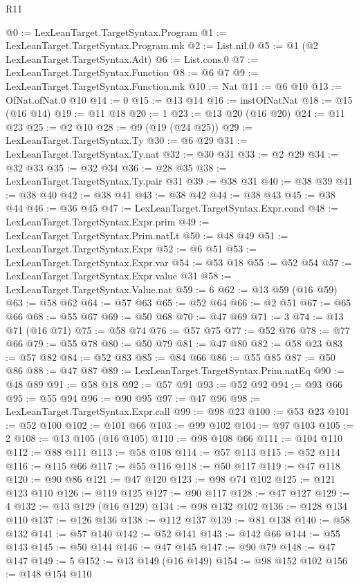 \begin{lexlean}{R11}
\begin{coremodule}
@0 := LexLeanTarget.TargetSyntax.Program
@1 := LexLeanTarget.TargetSyntax.Program.mk
@2 := List.nil.{0}
@5 := @1 (@2 LexLeanTarget.TargetSyntax.Adt)
@6 := List.cons.{0}
@7 := LexLeanTarget.TargetSyntax.Function
@8 := @6 @7
@9 := LexLeanTarget.TargetSyntax.Function.mk
@10 := Nat
@11 := @6 @10
@13 := OfNat.ofNat.{0} @10
@14 := 0
@15 := @13 @14
@16 := instOfNatNat
@18 := @15 (@16 @14)
@19 := @11 @18
@20 := 1
@23 := @13 @20 (@16 @20)
@24 := @11 @23
@25 := @2 @10
@28 := @9 (@19 (@24 @25))
@29 := LexLeanTarget.TargetSyntax.Ty
@30 := @6 @29
@31 := LexLeanTarget.TargetSyntax.Ty.nat
@32 := @30 @31
@33 := @2 @29
@34 := @32 @33
@35 := @32 @34
@36 := @28 @35
@38 := LexLeanTarget.TargetSyntax.Ty.pair @31
@39 := @38 @31
@40 := @38 @39
@41 := @38 @40
@42 := @38 @41
@43 := @38 @42
@44 := @38 @43
@45 := @38 @44
@46 := @36 @45
@47 := LexLeanTarget.TargetSyntax.Expr.cond
@48 := LexLeanTarget.TargetSyntax.Expr.prim
@49 := LexLeanTarget.TargetSyntax.Prim.natLt
@50 := @48 @49
@51 := LexLeanTarget.TargetSyntax.Expr
@52 := @6 @51
@53 := LexLeanTarget.TargetSyntax.Expr.var
@54 := @53 @18
@55 := @52 @54
@57 := LexLeanTarget.TargetSyntax.Expr.value @31
@58 := LexLeanTarget.TargetSyntax.Value.nat
@59 := 6
@62 := @13 @59 (@16 @59)
@63 := @58 @62
@64 := @57 @63
@65 := @52 @64
@66 := @2 @51
@67 := @65 @66
@68 := @55 @67
@69 := @50 @68
@70 := @47 @69
@71 := 3
@74 := @13 @71 (@16 @71)
@75 := @58 @74
@76 := @57 @75
@77 := @52 @76
@78 := @77 @66
@79 := @55 @78
@80 := @50 @79
@81 := @47 @80
@82 := @58 @23
@83 := @57 @82
@84 := @52 @83
@85 := @84 @66
@86 := @55 @85
@87 := @50 @86
@88 := @47 @87
@89 := LexLeanTarget.TargetSyntax.Prim.natEq
@90 := @48 @89
@91 := @58 @18
@92 := @57 @91
@93 := @52 @92
@94 := @93 @66
@95 := @55 @94
@96 := @90 @95
@97 := @47 @96
@98 := LexLeanTarget.TargetSyntax.Expr.call
@99 := @98 @23
@100 := @53 @23
@101 := @52 @100
@102 := @101 @66
@103 := @99 @102
@104 := @97 @103
@105 := 2
@108 := @13 @105 (@16 @105)
@110 := @98 @108 @66
@111 := @104 @110
@112 := @88 @111
@113 := @58 @108
@114 := @57 @113
@115 := @52 @114
@116 := @115 @66
@117 := @55 @116
@118 := @50 @117
@119 := @47 @118
@120 := @90 @86
@121 := @47 @120
@123 := @98 @74 @102
@125 := @121 @123 @110
@126 := @119 @125
@127 := @90 @117
@128 := @47 @127
@129 := 4
@132 := @13 @129 (@16 @129)
@134 := @98 @132 @102
@136 := @128 @134 @110
@137 := @126 @136
@138 := @112 @137
@139 := @81 @138
@140 := @58 @132
@141 := @57 @140
@142 := @52 @141
@143 := @142 @66
@144 := @55 @143
@145 := @50 @144
@146 := @47 @145
@147 := @90 @79
@148 := @47 @147
@149 := 5
@152 := @13 @149 (@16 @149)
@154 := @98 @152 @102
@156 := @148 @154 @110

\end{coremodule}
\end{lexlean}
